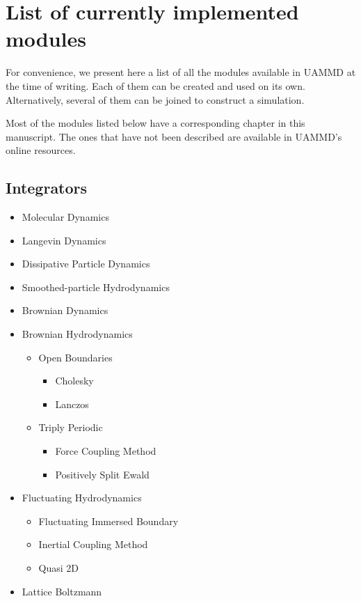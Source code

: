 \documentclass[ twoside,openright,titlepage,numbers=noenddot,%
headinclude,footinclude,cleardoublepage=empty,abstract=on,
BCOR=5mm,paper=b5,fontsize=11pt, dvipsnames
]{scrreprt}
\newcommand{\uammd}{\gls{UAMMD}\xspace}
\begin{document}
   
\chapter{List of currently implemented modules}\label{sec:modulelist}

For convenience, we present here a list of all the modules available in \uammd at the time of writing. Each of them can be created and used on its own. Alternatively, several of them can be joined to construct a simulation.

Most of the modules listed below have a corresponding chapter in this manuscript. The ones that have not been described are available in \uammd's online resources.

\section{Integrators}

\begin{itemize}
\item Molecular Dynamics
\item Langevin Dynamics
\item Dissipative Particle Dynamics
\item Smoothed-particle Hydrodynamics
\item Brownian Dynamics
\item Brownian Hydrodynamics
  \begin{itemize}
  \item Open Boundaries
    \begin{itemize}
    \item Cholesky
    \item Lanczos
    \end{itemize}
  \item Triply Periodic
    \begin{itemize}
    \item Force Coupling Method
    \item Positively Split Ewald
    \end{itemize}
  \end{itemize}
\item Fluctuating Hydrodynamics
  \begin{itemize}
  \item Fluctuating Immersed Boundary
  \item Inertial Coupling Method
  \item Quasi 2D
  \end{itemize}
\item Lattice Boltzmann
\end{itemize}
\end{document}
